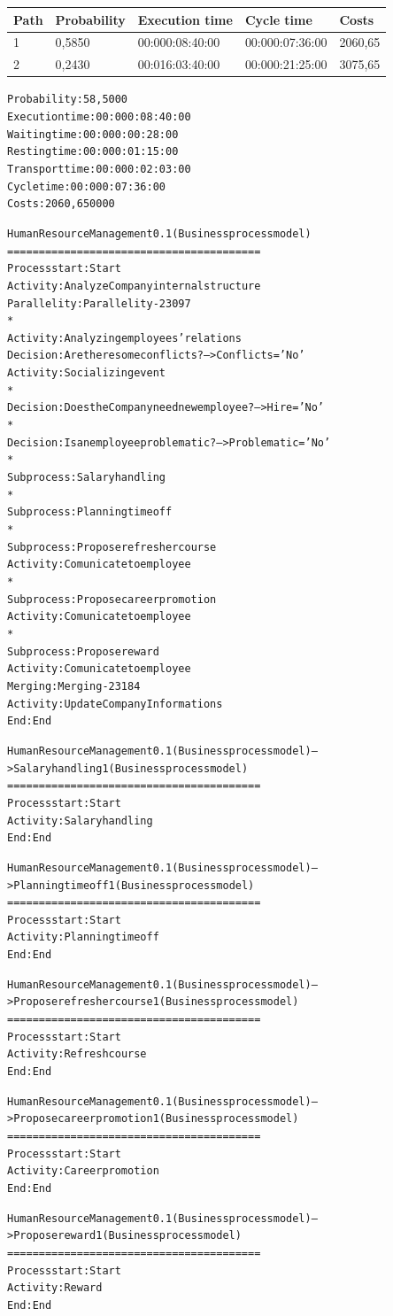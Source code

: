 \begin{table}
\centering
\begin{tabular}{|l|l|l|l|l|}
Path&Probability&Execution time&Cycle time&Costs\\
\hline
1&0,5850&00:000:08:40:00&00:000:07:36:00&2060,65\\
\hline
2&0,2430&00:016:03:40:00&00:000:21:25:00&3075,65
\end{tabular}
\end{table}

\begin{alltt}
Probability:   58,5000%
Execution time:  00:000:08:40:00
Waiting time:  00:000:00:28:00
Resting time:  00:000:01:15:00
Transport time:  00:000:02:03:00
Cycle time:  00:000:07:36:00
Costs:  2060,650000

Human Resource Management 0.1 (Business process model)
========================================
Process start: Start
Activity: Analyze Company internal structure
Parallelity: Parallelity-23097
    *
    Activity: Analyzing employees' relations
    Decision: Are there some conflicts? --> Conflicts='No'
    Activity: Socializing event
    *
    Decision: Does the Company need new employee? --> Hire = 'No'
    *
    Decision: Is an employee problematic? --> Problematic='No'
    *
    Subprocess: Salary handling
    *
    Subprocess: Planning time off
    *
    Subprocess: Propose refresher course
    Activity: Comunicate to employee
    *
    Subprocess: Propose career promotion
    Activity: Comunicate to employee
    *
    Subprocess: Propose reward
    Activity: Comunicate to employee
Merging: Merging-23184
Activity: Update Company Informations
End: End

Human Resource Management 0.1 (Business process model) --> Salary handling 1 (Business process model)
========================================
Process start: Start
Activity: Salary handling
End: End

Human Resource Management 0.1 (Business process model) --> Planning time off 1 (Business process model)
========================================
Process start: Start
Activity: Planning time off
End: End

Human Resource Management 0.1 (Business process model) --> Propose refresher course 1 (Business process model)
========================================
Process start: Start
Activity: Refresh course
End: End

Human Resource Management 0.1 (Business process model) --> Propose career promotion 1 (Business process model)
========================================
Process start: Start
Activity: Career promotion
End: End

Human Resource Management 0.1 (Business process model) --> Propose reward 1 (Business process model)
========================================
Process start: Start
Activity: Reward
End: End
\end{alltt}

